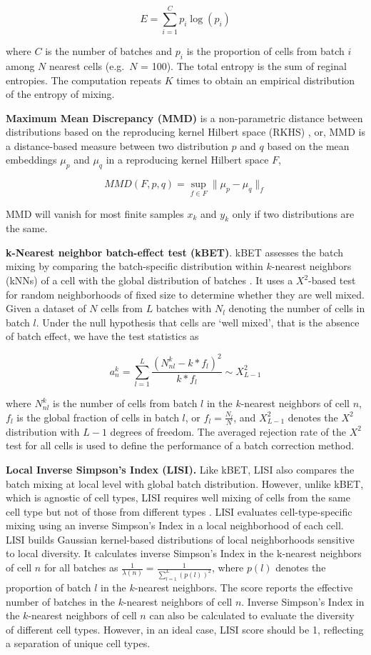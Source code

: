 \documentclass[
]{book}
\begin{document}
\[E = \sum_{i=1}^{C}p_{i}\log{(p_{i})}\]

where \(C\) is the number of batches and \(p_{i}\) is the proportion of cells from batch \(i\) among \(N\) nearest cells (e.g.~\(N\) = 100). The total entropy is the sum of reginal entropies. The computation repeats \(K\) times to obtain an empirical distribution of the entropy of mixing.

\textbf{Maximum Mean Discrepancy (MMD)} is a non-parametric distance between distributions based on the reproducing kernel Hilbert space (RKHS) \citep{RN185}, or, MMD is a distance-based measure between two distribution \(p\) and \(q\) based on the mean embeddings \(\mu_{p}\) and \(\mu_{q}\) in a reproducing kernel Hilbert space \(F\),

\[MMD(F,p,q)=\sup_{f \in F}\|\mu_{p}-\mu_{q}\|_{f}\]

MMD will vanish for most finite samples \(x_{k}\) and \(y_{k}\) only if two distributions are the same.

\textbf{k-Nearest neighbor batch-effect test (kBET)}. kBET assesses the batch mixing by comparing the batch-specific distribution within \(k\)-nearest neighbors (kNNs) of a cell with the global distribution of batches \citep{RN105}. It uses a \(X^2\)-based test for random neighborhoods of fixed size to determine whether they are well mixed. Given a dataset of \(N\) cells from \(L\) batches with \(N_{l}\) denoting the number of cells in batch \(l\). Under the null hypothesis that cells are `well mixed', that is the absence of batch effect, we have the test statistics as

\[a_{n}^{k} = \sum_{l=1}^{L}\frac{(N_{nl}^{k}-k*f_{l})^{2}}{k*f_{l}} \sim X^{2}_{L-1}\]

where \(N_{nl}^{k}\) is the number of cells from batch \(l\) in the \(k\)-nearest neighbors of cell \(n\), \(f_{l}\) is the global fraction of cells in batch \(l\), or \(f_{l}=\frac{N_{l}}{N}\), and \(X_{L-1}^2\) denotes the \(X^2\) distribution with \(L-1\) degrees of freedom. The averaged rejection rate of the \(Χ^2\) test for all cells is used to define the performance of a batch correction method.

\textbf{Local Inverse Simpson's Index (LISI).} Like kBET, LISI also compares the batch mixing at local level with global batch distribution. However, unlike kBET, which is agnostic of cell types, LISI requires well mixing of cells from the same cell type but not of those from different types \citep{RN74}. LISI evaluates cell-type-specific mixing using an inverse Simpson's Index in a local neighborhood of each cell. LISI builds Gaussian kernel-based distributions of local neighborhoods sensitive to local diversity. It calculates inverse Simpson's Index in the k-nearest neighbors of cell \(n\) for all batches as \(\frac{1}{\lambda(n)}=\frac{1}{\sum_{l=1}^{L}(p(l))^{2}}\), where \(p(l)\) denotes the proportion of batch \(l\) in the \(k\)-nearest neighbors. The score reports the effective number of batches in the \(k\)-nearest neighbors of cell \(n\). Inverse Simpson's Index in the \(k\)-nearest neighbors of cell \(n\) can also be calculated to evaluate the diversity of different cell types. However, in an ideal case, LISI score should be 1, reflecting a separation of unique cell types.
\end{document}
